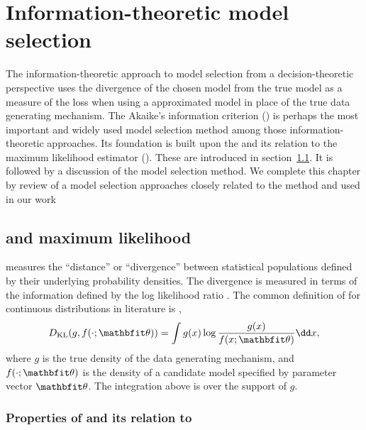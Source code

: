 \chapter{Information-theoretic model selection}
\label{cha:Information-theoretic model selection}

The information-theoretic approach to model selection from a
decision-theoretic perspective uses the divergence of the chosen model from
the true model as a measure of the loss when using a approximated model in
place of the true data generating mechanism. The Akaike's information
criterion (\aic) is perhaps the most important and widely used model selection
method among those information-theoretic approaches. Its foundation is built
upon the \kl and its relation to the maximum likelihood estimator (\mle).
These are introduced in section~\ref{sec:kl and maximum likelihood}. It is
followed by a discussion of the \aic model selection method. We complete this
chapter by review of a model selection approaches closely related to the \aic
method and used in our work

\section{\kl and maximum likelihood}
\label{sec:kl and maximum likelihood}

\kl measures the ``distance'' or ``divergence'' between statistical
populations defined by their underlying probability densities. The divergence
is measured in terms of the information defined by the log likelihood ratio
\parencite{Kullback1951}. The common definition of \kl for continuous
distributions in literature is \parencite[see][]{Claeskens2008},
\begin{equation}
  \dkl(g, f(\cdot;\bth)) = \int g(x)\log\frac{g(x)}{f(x;\bth)}\dd x,
  \label{eq:kld}
\end{equation}
where $g$ is the true density of the data generating mechanism, and
$f(\cdot;\bth)$ is the density of a candidate model specified by parameter
vector $\bth$. The integration above is over the support of $g$.

\subsection{Properties of \kl and its relation to \protect\mle}
\label{sub:Properties of kl and its relation to mle}

